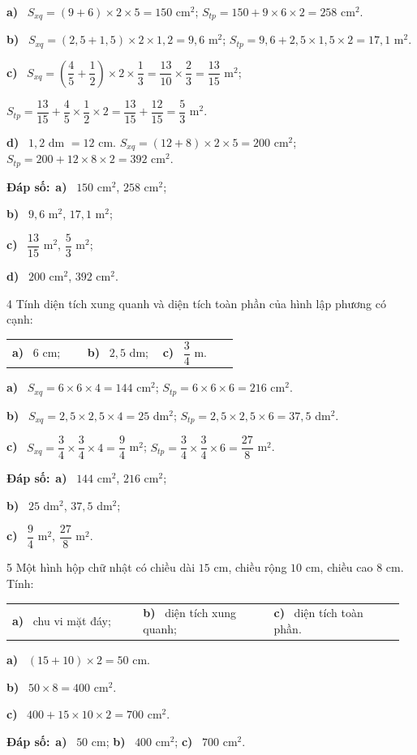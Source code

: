 \documentclass[11pt]{article}
\makeatletter
\newif\ifsol \solfalse
\renewcommand{\arraystretch}{1.35}
\providecommand{\AnsWord}{Đáp số}
\newcommand{\dapso}[1]{\par\textbf{\AnsWord:}\ #1}
\newcommand{\probsol}[1]{%
  \begin{lrbox}{\solmeasure}\begin{minipage}{\dimexpr\linewidth-24pt\relax}#1\end{minipage}\end{lrbox}%
  \ifsol
    \begin{solbox}#1\end{solbox}%
  \else
    \setlength{\solht}{\dimexpr\ht\solmeasure+\dp\solmeasure+0.85cm\relax}%
    \ifdim\solht<1.35cm\setlength{\solht}{1.35cm}\fi
    \begin{tcolorbox}[colback=white,colframe=Line,boxrule=0.8pt,arc=5pt,
      left=8pt,right=8pt,top=4pt,bottom=4pt,height=\solht]{\footnotesize\color{Slate}\itshape\WorkWord}\end{tcolorbox}%
  \fi}
\newcommand{\pa}[1]{\textbf{#1)}\ }
\newenvironment{cols3}{\par\vspace{3pt}\noindent\setlength{\tabcolsep}{0pt}\renewcommand{\arraystretch}{1.3}%
  \begin{tabular}{@{}>{\raggedright\arraybackslash\rule{0pt}{4.4ex}}p{0.32\linewidth}<{\rule[-2.3ex]{0pt}{0pt}}@{\hspace{0.015\linewidth}}>{\raggedright\arraybackslash\rule{0pt}{4.4ex}}p{0.32\linewidth}<{\rule[-2.3ex]{0pt}{0pt}}@{\hspace{0.015\linewidth}}>{\raggedright\arraybackslash\rule{0pt}{4.4ex}}p{0.32\linewidth}<{\rule[-2.3ex]{0pt}{0pt}}@{}}}%
  {\end{tabular}\par}
\newcommand{\gap}{\vspace{0.3cm}}
\def\WorkWord{Bài làm:}
\def\AnsWord{Đáp số}
\makeatother
\begin{document}
\probsol{
\pa{a} $S_{xq}=(9+6)\times2\times5=150$ cm$^2$; $S_{tp}=150+9\times6\times2=258$ cm$^2$.\par
\pa{b} $S_{xq}=(2{,}5+1{,}5)\times2\times1{,}2=9{,}6$ m$^2$; $S_{tp}=9{,}6+2{,}5\times1{,}5\times2=17{,}1$ m$^2$.\par
\pa{c} $S_{xq}=\left(\dfrac45+\dfrac12\right)\times2\times\dfrac13=\dfrac{13}{10}\times\dfrac23=\dfrac{13}{15}$ m$^2$;\par
$S_{tp}=\dfrac{13}{15}+\dfrac45\times\dfrac12\times2=\dfrac{13}{15}+\dfrac{12}{15}=\dfrac53$ m$^2$.\par
\pa{d} $1{,}2$ dm $=12$ cm. $S_{xq}=(12+8)\times2\times5=200$ cm$^2$; $S_{tp}=200+12\times8\times2=392$ cm$^2$.
\dapso{\pa{a} $150$ cm$^2$, $258$ cm$^2$;\par \pa{b} $9{,}6$ m$^2$, $17{,}1$ m$^2$;\par \pa{c} $\dfrac{13}{15}$ m$^2$, $\dfrac53$ m$^2$;\par \pa{d} $200$ cm$^2$, $392$ cm$^2$.}}
\gap
\begin{probbox}{4}{\relax}
Tính diện tích xung quanh và diện tích toàn phần của hình lập phương có cạnh:
\begin{cols3}
\pa{a} $6$ cm; & \pa{b} $2{,}5$ dm; & \pa{c} $\dfrac34$ m.
\end{cols3}
\end{probbox}
\probsol{
\pa{a} $S_{xq}=6\times6\times4=144$ cm$^2$; $S_{tp}=6\times6\times6=216$ cm$^2$.\par
\pa{b} $S_{xq}=2{,}5\times2{,}5\times4=25$ dm$^2$; $S_{tp}=2{,}5\times2{,}5\times6=37{,}5$ dm$^2$.\par
\pa{c} $S_{xq}=\dfrac34\times\dfrac34\times4=\dfrac94$ m$^2$; $S_{tp}=\dfrac34\times\dfrac34\times6=\dfrac{27}8$ m$^2$.
\dapso{\pa{a} $144$ cm$^2$, $216$ cm$^2$;\par \pa{b} $25$ dm$^2$, $37{,}5$ dm$^2$;\par \pa{c} $\dfrac94$ m$^2$, $\dfrac{27}8$ m$^2$.}}
\gap
\begin{probbox}{5}{\relax}
Một hình hộp chữ nhật có chiều dài $15$ cm, chiều rộng $10$ cm, chiều cao $8$ cm. Tính:
\begin{cols3}
\pa{a} chu vi mặt đáy; & \pa{b} diện tích xung quanh; & \pa{c} diện tích toàn phần.
\end{cols3}
\end{probbox}
\probsol{
\pa{a} $(15+10)\times2=50$ cm.\par
\pa{b} $50\times8=400$ cm$^2$.\par
\pa{c} $400+15\times10\times2=700$ cm$^2$.
\dapso{\pa{a} $50$ cm; \pa{b} $400$ cm$^2$; \pa{c} $700$ cm$^2$.}}
\end{document}
